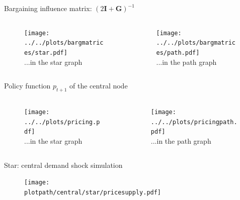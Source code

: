 \documentclass{beamer}
\newcommand{\matr}[1]{\bm{#1}}
\newcommand{\I}{\matr{I}}
\newcommand{\G}{\matr{G}}
\newcommand{\plotpath}{../../plots}
\begin{document}
\begin{frame} {Bargaining influence matrix: $(2\I + \G)^{-1}$ }

    \begin{columns}
        \begin{column}{.47\textwidth}
            \begin{figure}
                \texttt{[image: ../../plots/bargmatrices/star.pdf]}
                \\ ...in the star graph
            \end{figure}
        \end{column}
        \begin{column}{.47\textwidth}
            \begin{figure}
                \texttt{[image: ../../plots/bargmatrices/path.pdf]}
                \\ ...in the path graph
            \end{figure}
        \end{column}
    \end{columns}

\end{frame}

\begin{frame} {Policy function $p_{t+1}$ of the central node}
    \begin{columns}
        \begin{column}{.47\textwidth}
            \begin{figure}
                \texttt{[image: ../../plots/pricing.pdf]}
                \\ ...in the star graph
            \end{figure}
        \end{column}
        \begin{column}{.47\textwidth}
            \begin{figure}
                \texttt{[image: ../../plots/pricingpath.pdf]}
                \\ ...in the path graph
            \end{figure}
        \end{column}
    \end{columns}
\end{frame}

\begin{frame}{Star: central demand shock simulation}
    \begin{figure}[H]
        \centering
        \texttt{[image: \\plotpath/central/star/pricesupply.pdf]}
    \end{figure}

\end{frame}
\end{document}
